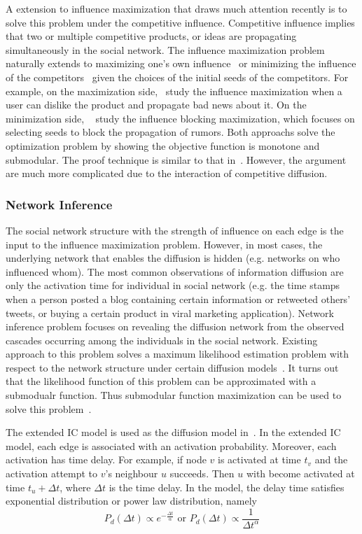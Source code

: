 A extension to influence maximization that draws much attention recently is to solve this problem under the competitive influence. Competitive influence implies that two or multiple competitive products, or ideas are propagating simultaneously in the social network. The influence maximization problem naturally extends to maximizing one's own influence~\cite{Bharathi:2007,Borodin:2010,chen2011influence} or
minimizing the influence of the competitors~\cite{he2012influence,Budak:2011} given the choices of the initial seeds of the competitors. For example, on the maximization side,~\cite{ChenCCKLRSWWY11} study the influence maximization when a user can dislike the product and propagate bad news about it. On the minimization side, ~\cite{HSCJ2012} study the influence blocking maximization, which focuses on selecting seeds to block the propagation of rumors. Both approachs solve the optimization problem by showing the objective function is monotone and submodular. The proof technique is similar to that in~\cite{KKT03}. However, the argument are much more complicated due to the interaction of competitive diffusion.
\subsubsection{Network Inference}
The social network structure with the strength of influence on each edge is the input to the influence maximization problem. However, in most cases, the underlying network that enables the diffusion is hidden (e.g. networks on who influenced whom). The most common observations of information diffusion are only the activation time for individual in social network (e.g. the time stamps  when a person posted a blog containing certain information or retweeted others' tweets, or buying a certain product in viral marketing application). Network inference problem focuses on revealing the diffusion network from the observed cascades occurring among the individuals in the social network. Existing approach to this problem solves a maximum likelihood estimation problem with respect to the network structure under certain diffusion models~\cite{GJA10,GB12,GDB11,SJ10}. It turns out that the likelihood function of this problem can be approximated with a submodualr function. Thus submodular function maximization can be used to solve this problem~\cite{GJA10,GB12}.

The extended IC model is used as the diffusion model in~\cite{GJA10,GB12}. In the extended IC model, each edge is associated with an activation probability. Moreover, each activation has time delay. For example, if node $v$ is activated at time $t_v$ and the activation attempt to $v$'s neighbour $u$ succeeds. Then $u$ with become activated at time $t_u+\Delta t$, where $\Delta t$ is the time delay. In the model, the delay time satisfies exponential distribution or power law distribution, namely
$$
P_d(\Delta t)\propto e^{-\frac{\Delta t}{\alpha}} \text{\ or\ } P_d(\Delta t)\propto\frac{1}{\Delta t^\alpha}
$$

